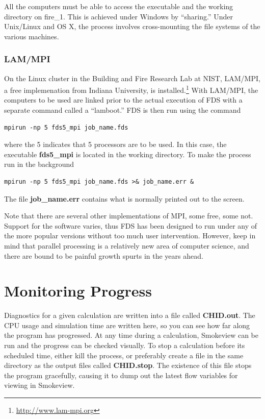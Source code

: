 \documentclass[11pt]{book}
\begin{document}
\begin{warning}
\noindent
All the computers must be able to access the executable and the working directory on {\ct fire\_1}.
This is achieved under Windows by ``sharing.'' Under Unix/Linux and OS X, the process involves cross-mounting the file
systems of the various machines.
\end{warning}


\subsubsection{LAM/MPI}

On the Linux cluster in the Building and Fire Research Lab at NIST, LAM/MPI, a free implemenation from Indiana University,
is installed.\footnote{\href{http://www.lam-mpi.org}{{\ct http://www.lam-mpi.org}}}
With LAM/MPI, the computers to be used are linked prior to the actual execution of FDS with a separate
command called a ``lamboot.''
FDS is then run using the command
\begin{verbatim}
mpirun -np 5 fds5_mpi job_name.fds
\end{verbatim}
where the 5 indicates that 5 processors are to be used. In this case, the executable {\bf fds5\_mpi} is located in the
working directory. To make the process run in the background
\begin{verbatim}
mpirun -np 5 fds5_mpi job_name.fds >& job_name.err &
\end{verbatim}
The file {\bf job\_name.err} contains what is normally printed out to the screen.


\begin{warning}
\noindent
Note that there are several other implementations of MPI, some free, some not.
Support for the software varies, thus FDS has been designed to run under any of the
more popular versions without too much user intervention. However, keep in mind
that parallel processing is a relatively new area of computer science,
and there are bound to be painful growth spurts in the years ahead.
\end{warning}


\section{Monitoring Progress}

Diagnostics for a given calculation are written into a file called {\bf CHID.out}.
The CPU usage and simulation time are written here, so you can see how
far along the program has progressed. At any time during a calculation,
Smokeview can be run and the progress can be checked visually.
To stop a calculation before its scheduled time, either
kill the process, or preferably create a file in the same directory as
the output files called {\bf CHID.stop}. The existence of this
file stops the program gracefully, causing it to dump out the
latest flow variables for viewing in Smokeview.
\end{document}
